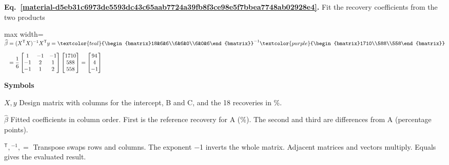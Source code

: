 \documentclass[11pt,a4paper]{article}
\begin{document}
\par\medskip
\noindent\begin{minipage}{\linewidth}
\label{material-d5eb31c6973de5593dc43c65aab7724a39fb8f3ce98e5f7bbea7748ab02928e4}
\noindent\textbf{Eq.~\ref*{material-d5eb31c6973de5593dc43c65aab7724a39fb8f3ce98e5f7bbea7748ab02928e4}.} Fit the recovery coefficients from the two products\par\nopagebreak
\begin{center}\begin{adjustbox}{max width=\linewidth}$\displaystyle \begin{aligned}\widehat\beta&=(X^{\mathsf T}X)^{-1}X^{\mathsf T}y=\textcolor{teal}{\begin{bmatrix}18&6&6\\6&6&0\\6&0&6\end{bmatrix}}^{-1}\textcolor{purple}{\begin{bmatrix}1710\\588\\558\end{bmatrix}}\\[.65em]&=\frac{1}{6}\begin{bmatrix}1&-1&-1\\-1&2&1\\-1&1&2\end{bmatrix}\begin{bmatrix}1710\\588\\558\end{bmatrix}=\begin{bmatrix}94\\4\\-1\end{bmatrix}\end{aligned}$\end{adjustbox}\end{center}

\par\noindent\textbf{Symbols}

\par\noindent\textbf{\(X,y\)} Design matrix with columns for the intercept, B and C, and the 18 recoveries in \%.

\par\noindent\textbf{\(\widehat\beta\)} Fitted coefficients in column order. First is the reference recovery for A (\%). The second and third are differences from A (percentage points).

\par\noindent\textbf{\({}^{\mathsf T},{}^{-1},=\)} Transpose swaps rows and columns. The exponent \ensuremath{-}1 inverts the whole matrix. Adjacent matrices and vectors multiply. Equals gives the evaluated result.

\end{minipage}\par
\medskip
\end{document}

